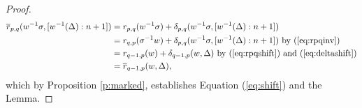 \documentclass[12pt]{amsart}
\numberwithin{equation}{section}
\begin{document}
\begin{proof}
\begin{equation*}
\begin{split}
 \overline{r}_{p,q}(w^{-1}\sigma, [w^{-1}(\Delta): n+1])&=r_{p,q}(w^{-1}\sigma)+\delta_{p,q}(w^{-1}\sigma,  [w^{-1}(\Delta): n+1])\\
&=r_{q,p}(\sigma^{-1}w)+\delta_{p,q}(w^{-1}\sigma,  [w^{-1}(\Delta): n+1]) \mbox{ by } (\ref{eq:rpqinv})\\
&=r_{q-1, p}(w)+\delta_{q-1,p}(w,\Delta)\mbox{ by } (\ref{eq:rpqshift}) \mbox{ and }(\ref{eq:deltashift})\\
&=\overline{r}_{q-1, p}(w, \Delta),
\end{split}
\end{equation*}
which by Proposition \ref{p:marked}, establishes Equation (\ref{eq:shift}) and the Lemma.
\end{proof}
\end{document}
